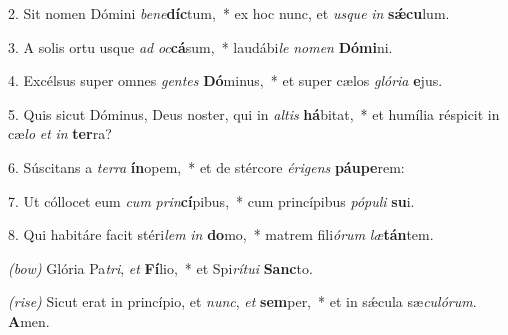 2. Sit nomen Dómini \textit{be}\textit{ne}\-\textbf{díc}tum,~* ex hoc nunc, et \textit{us}\textit{que} \textit{in} \textbf{s\'{\ae}}\textbf{cu}lum.

3. A solis ortu usque \textit{ad} \textit{oc}\textbf{cá}sum,~* laudábi\textit{le} \textit{no}\textit{men} \textbf{Dó}\textbf{mi}ni.

4. Excélsus super omnes \textit{gen}\textit{tes} \textbf{Dó}minus,~* et super cælos \textit{gló}\textit{ri}\textit{a} \textbf{e}jus.

5. Quis sicut Dóminus, Deus noster, qui in \textit{al}\textit{tis} \textbf{há}bitat,~* et humília réspicit in cæ\textit{lo} \textit{et} \textit{in} \textbf{ter}ra?

6. Súscitans a \textit{ter}\textit{ra} \textbf{ín}opem,~* et de stércore \textit{é}\textit{ri}\textit{gens} \textbf{páu}\textbf{pe}rem:

7. Ut cóllocet eum \textit{cum} \textit{prin}\textbf{cí}pibus,~* cum princípibus \textit{pó}\textit{pu}\textit{li} \textbf{su}i.

8. Qui habitáre facit stéri\textit{lem} \textit{in} \textbf{do}mo,~* matrem fili\textit{ó}\textit{rum} \textit{læ}\textbf{tán}tem.

{\color{red}\textit{(bow)}} Glória Pa\textit{tri}, \textit{et} \textbf{Fí}lio,~* et Spi\textit{rí}\textit{tu}\textit{i} \textbf{Sanc}to.

{\color{red}\textit{(rise)}} Sicut erat in princípio, et \textit{nunc}, \textit{et} \textbf{sem}per,~* et in s\'{\ae}cula sæ\textit{cu}\textit{ló}\textit{rum}. \textbf{A}men.